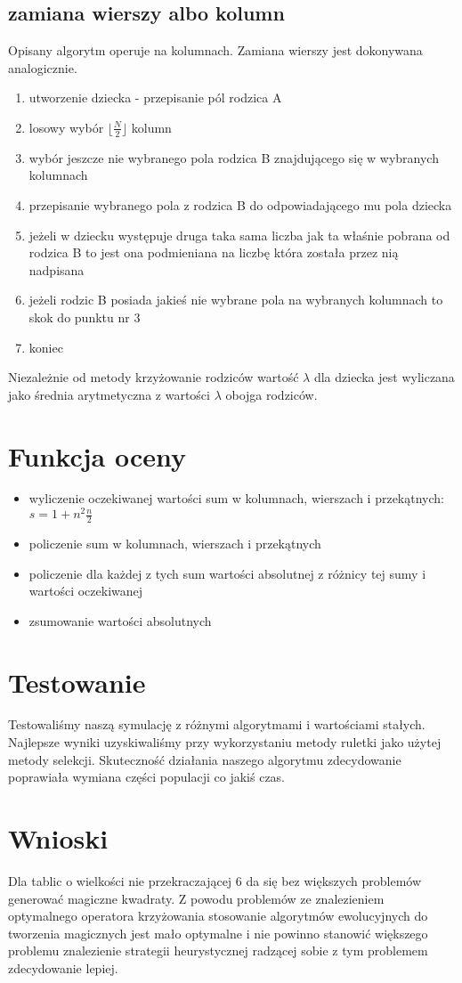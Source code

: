 \documentclass[a4paper,twoside,10pt]{article}
\begin{document}
		\subsection{zamiana wierszy albo kolumn}
		Opisany algorytm operuje na kolumnach. Zamiana wierszy jest dokonywana analogicznie.
		\begin{enumerate}
			\item utworzenie dziecka - przepisanie pól rodzica A
			\item losowy wybór $ \lfloor\frac{N}{2}\rfloor $ kolumn
			\item wybór jeszcze nie wybranego pola rodzica B znajdującego się w wybranych kolumnach
			\item przepisanie wybranego pola z rodzica B do odpowiadającego mu pola dziecka
			\item jeżeli w dziecku występuje druga taka sama liczba jak ta właśnie pobrana od rodzica B to jest ona podmieniana na liczbę która została przez nią nadpisana
			\item jeżeli rodzic B posiada jakieś nie wybrane pola na wybranych kolumnach to skok do punktu nr 3
			\item koniec
		\end{enumerate}
		Niezależnie od metody krzyżowanie rodziców wartość $ \lambda $ dla dziecka jest wyliczana jako średnia arytmetyczna z wartości $ \lambda $ obojga rodziców.
\section{Funkcja oceny}
	\begin{itemize}
		\item wyliczenie oczekiwanej wartości sum w kolumnach, wierszach i przekątnych: $ s = 1 + n^2 \frac{n}{2} $
		\item policzenie sum w kolumnach, wierszach i przekątnych
		\item policzenie dla każdej z tych sum wartości absolutnej z różnicy tej sumy i wartości oczekiwanej
		\item zsumowanie wartości absolutnych
	\end{itemize}

\section{Testowanie}
	Testowaliśmy naszą symulację z różnymi algorytmami i wartościami stałych. Najlepsze wyniki uzyskiwaliśmy przy wykorzystaniu metody ruletki jako użytej metody selekcji. Skuteczność działania naszego algorytmu zdecydowanie poprawiała wymiana części populacji co jakiś czas.
			
\section{Wnioski}
	Dla tablic o wielkości nie przekraczającej 6 da się bez większych problemów generować magiczne kwadraty. Z powodu problemów ze znalezieniem optymalnego operatora krzyżowania stosowanie algorytmów ewolucyjnych do tworzenia magicznych jest mało optymalne i nie powinno stanowić większego problemu znalezienie strategii heurystycznej radzącej sobie z tym problemem zdecydowanie lepiej.
\end{document}
